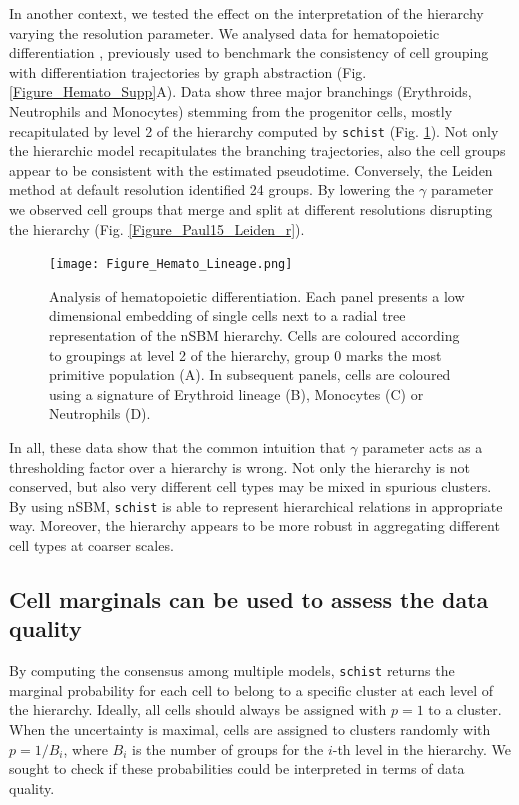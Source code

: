 \documentclass[10pt]{article}
\begin{document}
In another context, we tested the effect on the interpretation of the hierarchy varying the resolution parameter. We analysed data for hematopoietic differentiation \cite{paul_2015}, previously used to benchmark the consistency of cell grouping with differentiation trajectories by graph abstraction \cite{wolf_2019} (Fig. \ref{Figure_Hemato_Supp}A). Data show three major branchings (Erythroids, Neutrophils and Monocytes) stemming from the progenitor cells, mostly recapitulated by level 2 of the hierarchy computed by \texttt{schist} (Fig. \ref{Figure_Hemato_Lineage}). Not only the hierarchic model recapitulates the branching trajectories, also the cell groups appear to be consistent with the estimated pseudotime. Conversely, the Leiden method at default resolution identified 24 groups. By lowering the $\gamma$ parameter we observed cell groups that merge and split at different resolutions disrupting the hierarchy (Fig. \ref{Figure_Paul15_Leiden_r}). 


\begin{figure}[H]
\centering
\texttt{[image: Figure\_Hemato\_Lineage.png]}
\caption[]{Analysis of hematopoietic differentiation. Each panel presents a low dimensional embedding of single cells next to a radial tree representation of the nSBM hierarchy. Cells are coloured according to groupings at level 2 of the hierarchy, group 0 marks the most primitive population (A). In subsequent panels, cells are coloured using a signature of Erythroid lineage (B), Monocytes (C) or Neutrophils (D).}\label{Figure_Hemato_Lineage}
\end{figure}

In all, these data show that the common intuition that $\gamma$ parameter acts as a thresholding factor over a hierarchy is wrong. Not only the hierarchy is not conserved, but also very different cell types may be mixed in spurious clusters. By using nSBM, \texttt{schist} is able to represent hierarchical relations in appropriate way. Moreover, the hierarchy appears to be more robust in aggregating different cell types at coarser scales.

\subsection*{Cell marginals can be used to assess the data quality}

By computing the consensus among multiple models, \texttt{schist} returns the marginal probability for each cell to belong to a specific cluster at each level of the hierarchy. Ideally, all cells should always be assigned with $p=1$ to a cluster. When the uncertainty is maximal, cells are assigned to clusters randomly with $p=1/B_i$, where $B_i$ is the number of groups for the $i$-th level in the hierarchy. We sought to check if these probabilities could be interpreted in terms of data quality. 
\end{document}

